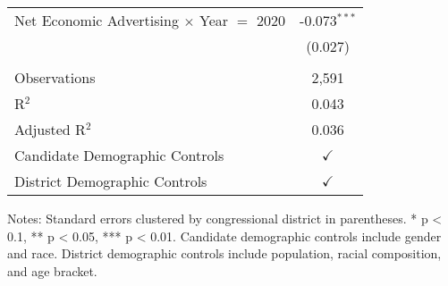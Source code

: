 \begin{table}[htbp]
\begin{tabular}{lc}
      Net Economic Advertising $\times$ Year $=$ 2020  & -0.073$^{***}$\\   
                                                       & (0.027)\\   
       \\
      Observations                                     & 2,591\\  
      R$^2$                                            & 0.043\\  
      Adjusted R$^2$                                   & 0.036\\  
      Candidate Demographic Controls                   & $\checkmark$\\   
      District Demographic Controls                    & $\checkmark$\\   
      \bottomrule
   \end{tabular}
   
   \par \raggedright 
   \footnotesize Notes: Standard errors clustered by congressional district in parentheses. * p < 0.1, ** p < 0.05, *** p < 0.01. Candidate demographic controls include gender and race. District demographic controls include population, racial composition, and age bracket.
\end{table}


